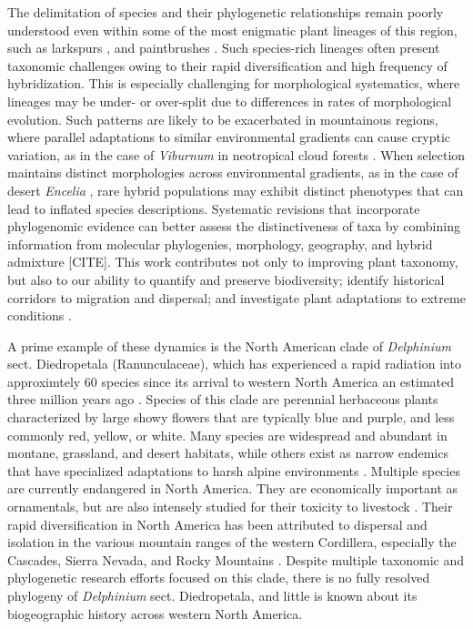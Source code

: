 \documentclass[11pt]{article}
\begin{document}
The delimitation of species and their phylogenetic relationships remain poorly
understood even within some of the most enigmatic plant lineages of this region, 
such as larkspurs \citep{jabbour_phylogeny_2012, xiang_recircumscription_2017}, 
and paintbrushes \citep{tank_phylogenetic_2009,jacobs_quantifying_2019}.
% 
Such species-rich lineages often present taxonomic challenges owing to their 
rapid diversification and high frequency of hybridization.
% 
This is especially challenging for morphological systematics, where lineages
may be under- or over-split due to differences in rates of morphological evolution.
% 
Such patterns are likely to be exacerbated in mountainous regions, where
parallel adaptations to similar environmental gradients can cause cryptic variation,
as in the case of \emph{Viburnum} in neotropical
cloud forests \citep{donoghue_replicated_2022}. 
% 
When selection maintains distinct morphologies across environmental
gradients, as in the case of desert \emph{Encelia} 
\citep{divittorio_natural_2020}, rare hybrid populations may exhibit
distinct phenotypes that can lead to inflated species descriptions.
% 
Systematic revisions that incorporate phylogenomic evidence can better
assess the distinctiveness of taxa by combining information from molecular
phylogenies, morphology, geography, and hybrid admixture [CITE].
% 
This work contributes not only to improving plant taxonomy, but also to
our ability to quantify and preserve biodiversity; identify historical 
corridors to migration and dispersal; and investigate plant adaptations
to extreme conditions \citep{anstett_2021, gross_unforeseen_2024, melton_draft_2021}. 


A prime example of these dynamics is the North American clade of \emph{Delphinium} 
sect. Diedropetala (Ranunculaceae), which has experienced a rapid radiation 
into approximtely 60 species since its arrival to western North America an 
estimated three million years ago \citep{jabbour_phylogeny_2012}.
% 
Species of this clade are perennial herbaceous plants characterized by large 
showy flowers that are typically blue and purple, and less commonly red, yellow, 
or white. 
% 
Many species are widespread and abundant in montane, grassland, and desert habitats,
while others exist as narrow endemics that have specialized adaptations to harsh 
alpine environments \citep{warnock_taxonomic_1995}. 
% 
Multiple species are currently endangered in North America. 
They are economically important as ornamentals, but are also intensely studied for 
their toxicity to livestock \citep{cook_2009, cook_two_2017, gardner_taxonomic_2002, pfister_grazing_2014}.
Their rapid diversification in North America has been attributed to dispersal and 
isolation in the various mountain ranges of the western Cordillera, especially the
Cascades, Sierra Nevada, and Rocky Mountains \citep{Warnock_1997}.
% 
Despite multiple taxonomic and phylogenetic research efforts focused on this clade,
there is no fully resolved phylogeny of \emph{Delphinium} sect. Diedropetala,
and little is known about its biogeographic history across western North America.
\end{document}
